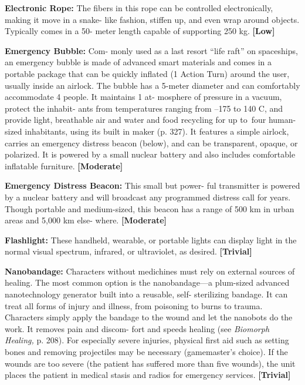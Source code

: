 \textbf{Electronic Rope:} The fibers in this rope can be 
controlled electronically, making it move in a snake-
like fashion, stiffen up, and 
even wrap around objects. 
Typically comes in a 50-
meter length capable of 
supporting 250 kg. \textbf{[Low]}

\textbf{Emergency Bubble:} Com-
monly used as a last resort 
``life raft'' on spaceships, 
an emergency bubble is 
made of advanced smart 
materials and comes in 
a portable package that 
can be quickly inflated 
(1 Action Turn) around 
the user, usually inside an 
airlock. The bubble has a 
5-meter diameter and can 
comfortably accommodate 
4 people. It maintains 1 at-
mosphere of pressure in a vacuum, protect the inhabit-
ants from temperatures ranging from –175 to 140 C, 
and provide light, breathable air and water and food 
recycling for up to four human-sized inhabitants, using 
its built in maker (p. 327). It features a simple airlock, 
carries an emergency distress beacon (below), and can 
be transparent, opaque, or polarized. It is powered by 
a small nuclear battery and also includes comfortable 
inflatable furniture. \textbf{[Moderate]}

\textbf{Emergency Distress Beacon:} This small but power-
ful transmitter is powered by a nuclear battery and 
will broadcast any programmed distress call for years. 
Though portable and medium-sized, this beacon has 
a range of 500 km in urban areas and 5,000 km else-
where. \textbf{[Moderate]}

\textbf{Flashlight:} These handheld, wearable, or portable 
lights can display light in the normal visual spectrum, 
infrared, or ultraviolet, as desired. \textbf{[Trivial]}

\textbf{Nanobandage: }Characters without medichines must 
rely on external sources of healing. The most common 
option is the nanobandage—a plum-sized advanced 
nanotechnology generator built into a reusable, self-
sterilizing bandage. It can treat all forms of injury and 
illness, from poisoning to burns to trauma. Characters 
simply apply the bandage to the wound and let the 
nanobots do the work. It removes pain and discom-
fort and speeds healing (see \textit{Biomorph Healing,} p. 
208). For especially severe injuries, physical first aid 
such as setting bones and removing projectiles may 
be necessary (gamemaster's choice). If the wounds are 
too severe (the patient has suffered more than five 
wounds), the unit places the patient in medical stasis 
and radios for emergency services. \textbf{[Trivial]}

